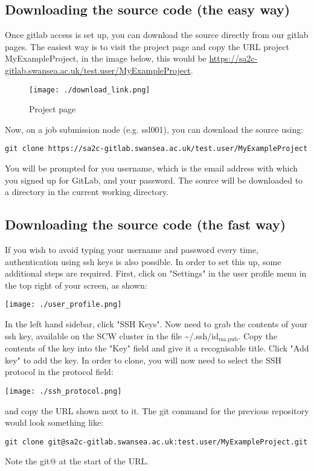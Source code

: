 \documentclass[11pt]{article}
\begin{document}
\subsection{Downloading the source code (the easy way)}
\label{sec:org0b5e0f8}
Once gitlab access is set up, you can download the source directly from our
gitlab pages. The easiest way is to visit the project page and copy the URL
project MyExampleProject, in the image below, this would be
\url{https://sa2c-gitlab.swansea.ac.uk/test.user/MyExampleProject}.

\begin{figure}[htbp]
\centering
\texttt{[image: ./download\_link.png]}
\caption{Project page}
\end{figure}

Now, on a job submission node (e.g. ssl001), you can download the source using:

\begin{verbatim}
git clone https://sa2c-gitlab.swansea.ac.uk/test.user/MyExampleProject
\end{verbatim}

You will be prompted for you username, which is the email address with which you
signed up for GitLab, and your password. The source will be downloaded to a
directory in the current working directory.

\subsection{Downloading the source code (the fast way)}
\label{sec:org2074f81}
If you wish to avoid typing your username and password every time, authentication using
ssh keys is also possible. In order to set this up, some additional steps are
required. First, click on "Settings" in the user profile menu in the top right
of your screen, as shown:
\begin{center}
\texttt{[image: ./user\_profile.png]}
\end{center}
In the left hand sidebar, click "SSH Keys". Now need to grab the contents of
your ssh key, available on the SCW cluster in the file \textasciitilde{}/.ssh/id\(_{\text{rsa.pub}}\). Copy
the contents of the key into the "Key" field and give it a recognisable title.
Click "Add key" to add the key. In order to clone, you will now need to select
the SSH protocol in the protocol field:
\begin{center}
\texttt{[image: ./ssh\_protocol.png]}
\end{center}
and copy the URL shown next to it. The git command for the previous repository
would look something like:
\begin{verbatim}
git clone git@sa2c-gitlab.swansea.ac.uk:test.user/MyExampleProject.git
\end{verbatim}
Note the git@ at the start of the URL.
\end{document}
